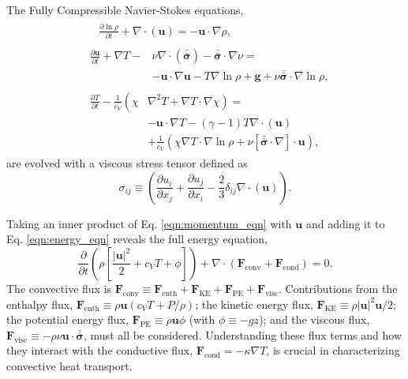 \documentclass[aps, prl, twocolumn, nofootinbib, groupedaddress, amsfonts, amssymb, amsmath]{revtex4-1}
\newcommand{\Div}[1]{\ensuremath{\nabla\cdot\left( #1\right)}}
\newcommand{\grad}{\ensuremath{\nabla}}
\newcommand{\lilstressT}{\ensuremath{\bm{\bar{\bar{\sigma}}}}}
\begin{document}
The Fully Compressible Navier-Stokes equations,
\begin{align}
&\begin{aligned}
&\frac{\partial \ln\rho}{\partial t} + \Div{\bm{u}} = -\bm{u}\cdot\grad\rho,
	\label{eqn:continuity_eqn}
\end{aligned}\\
&\begin{aligned}
\frac{\partial\bm{u}}{\partial t} + \grad T - &\nu\Div{\lilstressT} - \lilstressT\cdot\grad\nu = \\
&-\bm{u}\cdot\grad\bm{u} - T\grad\ln\rho + \bm{g} + \nu\lilstressT\cdot\grad\ln\rho,
\label{eqn:momentum_eqn}
\end{aligned}\\
&\begin{aligned}
\frac{\partial T}{\partial t} -\frac{1}{c_V}\left(\right.\chi&\left.\grad^2 T + \grad T\cdot\grad\chi\right) = \\
	&-\bm{u}\cdot\grad T - (\gamma-1)T\Div{\bm{u}} \\
	&+ \frac{1}{c_V}\left(\chi\grad T \cdot\grad\ln\rho +\nu\left[\lilstressT\cdot\nabla\right]\cdot\bm{u}\right), 
	\label{eqn:energy_eqn}
\end{aligned}
\end{align}
are evolved with a viscous stress tensor defined as
\begin{equation}
\sigma_{ij} \equiv \left(\frac{\partial u_i}{\partial x_j} + \frac{\partial u_j}{\partial x_i} - \frac{2}{3}\delta_{ij}\Div{\bm{u}}\right).
	\label{eqn:stress_tensor}
\end{equation}


Taking an inner product of
Eq. \ref{eqn:momentum_eqn} with $\bm{u}$ and adding it to 
Eq. \ref{eqn:energy_eqn} reveals the full energy equation,
\begin{equation}
\frac{\partial}{\partial t}\left(\rho\left[\frac{|\bm{u}|^2}{2} + c_V T + \phi\right]\right) +
\Div{\bm{F}_{\text{conv}} + \bm{F}_{\text{cond}}} = 0.
	\label{eqn:energy_eqn_full}
\end{equation}
The convective flux is
$
\bm{F}_{\text{conv}} \equiv \bm{F}_{\text{enth}} + \bm{F}_{\text{KE}} + \bm{F}_{\text{PE}} + \bm{F}_{\text{visc}}.
$
Contributions from the enthalpy flux, $\bm{F}_{\text{enth}} \equiv \rho\bm{u}(c_V T + P/\rho)$;
the kinetic energy flux, $\bm{F}_{\text{KE}} \equiv \rho|\bm{u}|^2\bm{u}/2$;
the potential energy flux, $\bm{F}_{\text{PE}} \equiv \rho\bm{u}\phi$ (with $\phi \equiv -gz$);
and the viscous flux, $\bm{F}_{\text{visc}} \equiv -\rho\nu\bm{u}\cdot\lilstressT$, must all be considered. 
Understanding these flux terms and how they interact with the conductive flux, 
$\bm{F}_{\text{cond}} = -\kappa \grad T$, is crucial in characterizing
convective heat transport.
\end{document}
